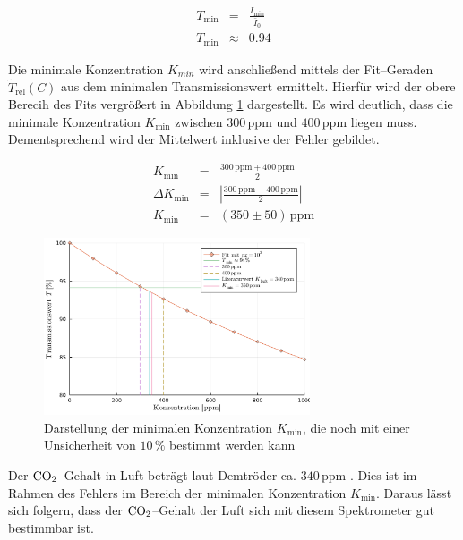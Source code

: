 \documentclass[12pt,a4paper]{scrartcl}
\numberwithin{equation}{section} %
\begin{document}
\begin{eqnarray}
	T_\mathrm{min} &=& \frac{I_\mathrm{min}}{\bar{I}_0} \\
	T_\mathrm{min} &\approx& 0.94
\end{eqnarray}

\noindent
Die minimale Konzentration $K_{min}$ wird anschließend mittels der Fit--Geraden $\tilde{T}_\mathrm{rel}(C)$ aus dem minimalen Transmissionswert ermittelt. Hierfür wird der obere Berecih des Fits vergrößert in Abbildung \ref{abb:fitZoom} dargestellt. Es wird deutlich, dass die minimale Konzentration $K_\mathrm{min}$ zwischen $300 \mathrm{\, ppm}$ und $400 \mathrm{\, ppm}$ liegen muss. Dementsprechend wird der Mittelwert inklusive der Fehler gebildet.

\begin{eqnarray}
	K_\mathrm{min} &=&  \frac{300 \mathrm{\, ppm} + 400 \mathrm{\, ppm}}{2} \\
	\Delta K_\mathrm{min} &=& \left|\frac{300 \mathrm{\, ppm} - 400 \mathrm{\, ppm}}{2}\right| \\
	K_\mathrm{min} &=& (350 \pm 50) \mathrm{\, ppm}
\end{eqnarray}

\begin{figure}[h]
	\centering
	\includegraphics[width=0.7\textwidth]{../media/B1.1/fitZoomPpm.pdf}
	\caption{Darstellung der minimalen Konzentration $K_\mathrm{min}$,
		die noch mit einer Unsicherheit von $10 \mathrm{\, \%}$ bestimmt werden kann}
	\label{abb:fitZoom}
\end{figure}

\noindent
Der $\ce{CO_2}$--Gehalt in Luft beträgt laut Demtröder ca. $340 \mathrm{\, ppm}$ \cite{Demtröder Kern/Atom}.
Dies ist im Rahmen des Fehlers im Bereich der minimalen Konzentration $K_\mathrm{min}$. Daraus lässt sich folgern, dass der $\ce{CO_2}$--Gehalt der Luft sich mit diesem Spektrometer gut bestimmbar ist.
\end{document}
